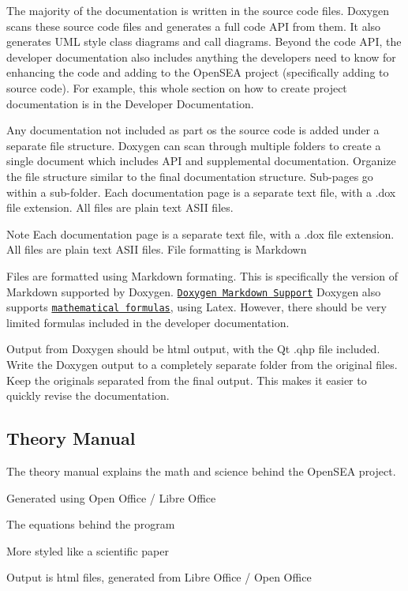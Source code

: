 The majority of the documentation is written in the source code files. Doxygen scans these source code files and generates a full code A\-P\-I from them. It also generates U\-M\-L style class diagrams and call diagrams. Beyond the code A\-P\-I, the developer documentation also includes anything the developers need to know for enhancing the code and adding to the Open\-S\-E\-A project (specifically adding to source code). For example, this whole section on how to create project documentation is in the Developer Documentation.

Any documentation not included as part os the source code is added under a separate file structure. Doxygen can scan through multiple folders to create a single document which includes A\-P\-I and supplemental documentation. Organize the file structure similar to the final documentation structure. Sub-\/pages go within a sub-\/folder. Each documentation page is a separate text file, with a .dox file extension. All files are plain text A\-S\-I\-I files.

\begin{DoxyNote}{Note}
Each documentation page is a separate text file, with a .dox file extension. All files are plain text A\-S\-I\-I files. File formatting is Markdown
\end{DoxyNote}
Files are formatted using Markdown formating. This is specifically the version of Markdown supported by Doxygen. \href{http://www.stack.nl/~dimitri/doxygen/manual/markdown.html}{\tt Doxygen Markdown Support} Doxygen also supports \href{http://www.stack.nl/~dimitri/doxygen/manual/formulas.html}{\tt mathematical formulas}, using Latex. However, there should be very limited formulas included in the developer documentation.

Output from Doxygen should be html output, with the Qt .qhp file included. Write the Doxygen output to a completely separate folder from the original files. Keep the originals separated from the final output. This makes it easier to quickly revise the documentation.\hypertarget{documentation_documentation_theory}{}\subsection{Theory Manual}\label{documentation_documentation_theory}
The theory manual explains the math and science behind the Open\-S\-E\-A project.
\begin{DoxyItemize}
\item Generated using Open Office / Libre Office
\item The equations behind the program
\item More styled like a scientific paper
\item Output is html files, generated from Libre Office / Open Office
\end{DoxyItemize}

